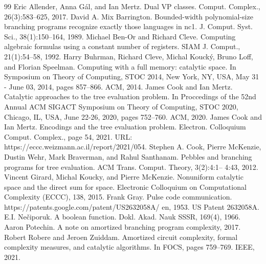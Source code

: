 \documentclass[10pt,a4paper]{article}
\begin{document}
\begin{thebibliography}{99}
 Eric Allender, Anna Gál, and Ian Mertz. Dual VP classes. Comput. Complex., 26(3):583–625, 2017.
 David A. Mix Barrington. Bounded-width polynomial-size branching programs recognize exactly those languages in nc1. J. Comput. Syst. Sci., 38(1):150–164, 1989.
 Michael Ben-Or and Richard Cleve. Computing algebraic formulas using a constant number of registers. SIAM J. Comput., 21(1):54–58, 1992.
 Harry Buhrman, Richard Cleve, Michal Koucký, Bruno Loff, and Florian Speelman. Computing with a full memory: catalytic space. In Symposium on Theory of Computing, STOC 2014, New York, NY, USA, May 31 - June 03, 2014, pages 857–866. ACM, 2014.
 James Cook and Ian Mertz. Catalytic approaches to the tree evaluation problem. In Proccedings of the 52nd Annual ACM SIGACT Symposium on Theory of Computing, STOC 2020, Chicago, IL, USA, June 22-26, 2020, pages 752–760. ACM, 2020.
 James Cook and Ian Mertz. Encodings and the tree evaluation problem. Electron. Colloquium Comput. Complex., page 54, 2021. URL: https://eccc.weizmann.ac.il/report/2021/054.
 Stephen A. Cook, Pierre McKenzie, Dustin Wehr, Mark Braverman, and Rahul Santhanam. Pebbles and branching programs for tree evaluation. ACM Trans. Comput. Theory, 3(2):4:1– 4:43, 2012.
 Vincent Girard, Michal Koucky, and Pierre McKenzie. Nonuniform catalytic space and the direct sum for space. Electronic Colloquium on Computational Complexity (ECCC), 138, 2015.
 Frank Gray. Pulse code communication. https://patents.google.com/patent/US2632058A/ en, 1953. US Patent 2632058A.
 E.I. Nečiporuk. A boolean function. Dokl. Akad. Nauk SSSR, 169(4), 1966.
 Aaron Potechin. A note on amortized branching program complexity, 2017.
 Robert Robere and Jeroen Zuiddam. Amortized circuit complexity, formal complexity measures, and catalytic algorithms. In FOCS, pages 759–769. IEEE, 2021.
\end{thebibliography}
\end{document}
